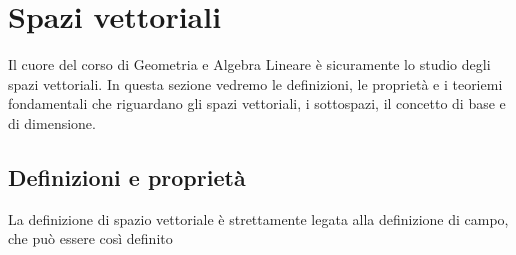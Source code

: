 \chapter{Spazi vettoriali}

\thispagestyle{empty}

Il cuore del corso di Geometria e Algebra Lineare è sicuramente lo studio degli spazi vettoriali. In questa sezione vedremo le definizioni, le proprietà e i teoriemi fondamentali che riguardano gli spazi vettoriali, i sottospazi, il concetto di base e di dimensione. \\

\section{Definizioni e proprietà}
La definizione di spazio vettoriale è strettamente legata alla definizione di campo, che può essere così definito
